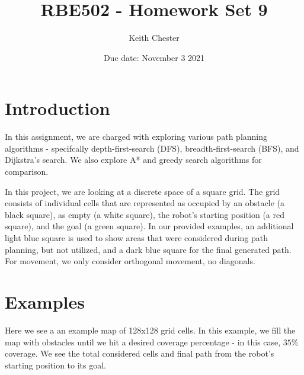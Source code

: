 \documentclass{article}
\title{RBE502 - Homework Set 9}
\author{Keith Chester}
\date{Due date: November 3 2021}
\begin{document}
\maketitle

\section*{Introduction}
In this assignment, we are charged with exploring various path planning algorithms - specifcally depth-first-search (DFS), breadth-first-search (BFS), and Dijkstra's search. We also explore A* and greedy search algorithms for comparison.

In this project, we are looking at a discrete space of a square grid. The grid consists of individual cells that are represented as occupied by an obstacle (a black square), as empty (a white square), the robot's starting position (a red square), and the goal (a green square). In our provided examples, an additional light blue square is used to show areas that were considered during path planning, but not utilized, and a dark blue square for the final generated path. For movement, we only consider orthogonal movement, no diagonals.

\section*{Examples}
Here we see a an example map of 128x128 grid cells. In this example, we fill the map with obstacles until we hit a desired coverage percentage - in this case, $ 35\% $ coverage. We see the total considered cells and final path from the robot's starting position to its goal.
\end{document}

